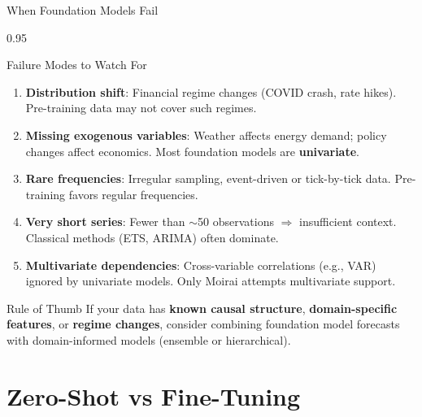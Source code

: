 \documentclass[9pt, aspectratio=169, t]{beamer}
\begin{document}
\begin{frame}{When Foundation Models Fail}
    \begin{cminipage}{0.95\textwidth}
    \vspace{-3mm}
    \begin{alertblock}{Failure Modes to Watch For}
        {\scriptsize
        \begin{enumerate}\setlength{\itemsep}{0pt}
            \item \textbf{Distribution shift}: Financial regime changes (COVID crash, rate hikes). Pre-training data may not cover such regimes.
            \item \textbf{Missing exogenous variables}: Weather affects energy demand; policy changes affect economics. Most foundation models are \textbf{univariate}.
            \item \textbf{Rare frequencies}: Irregular sampling, event-driven or tick-by-tick data. Pre-training favors regular frequencies.
            \item \textbf{Very short series}: Fewer than $\sim$50 observations $\Rightarrow$ insufficient context. Classical methods (ETS, ARIMA) often dominate.
            \item \textbf{Multivariate dependencies}: Cross-variable correlations (e.g., VAR) ignored by univariate models. Only Moirai attempts multivariate support.
        \end{enumerate}
        }
    \end{alertblock}
    \vspace{-3mm}
    \begin{exampleblock}{Rule of Thumb}
        {\scriptsize If your data has \textbf{known causal structure}, \textbf{domain-specific features}, or \textbf{regime changes}, consider combining foundation model forecasts with domain-informed models (ensemble or hierarchical).}
    \end{exampleblock}
    \end{cminipage}
\end{frame}

\section{Zero-Shot vs Fine-Tuning}
\end{document}
